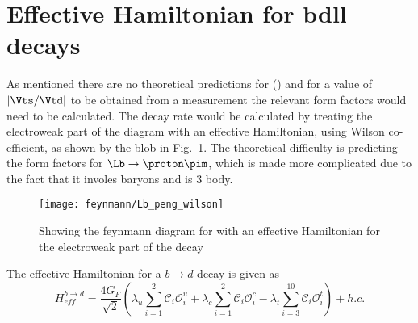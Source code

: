 \section{Effective Hamiltonian for b\to dll decays} %
As mentioned there are no theoretical predictions for \BF(\Lbpi) and for a value of $|\Vts/\Vtd|$ to be obtained from a measurement the relevant form factors would need to be calculated. The decay rate would be calculated by treating the electroweak part of the diagram with an effective Hamiltonian, using Wilson co-efficient, as shown by the blob in Fig.~\ref{fig:wilson}. The theoretical difficulty is predicting the form factors for $\Lb\to\proton\pim$, which is made more complicated due to the fact that it involes baryons and is 3 body.
\begin{figure}[h!]
  \centering
  \texttt{[image: feynmann/Lb\_peng\_wilson]}
  \caption{Showing the feynmann diagram for \Lbpi with an effective Hamiltonian for the electroweak part of the decay~\cite{lowrecoil}}
  \label{fig:wilson}
    \end{figure}
The effective Hamiltonian for a $b\to d$ decay is given as
\begin{equation}
H^{b\to d}_{eff} = \frac{4G_{F}}{\sqrt{2}}(\lambda_{u}\sum^{2}_{i=1}\mathcal{C}_{i}\mathcal{O}^{u}_{i} + \lambda_{c}\sum^{2}_{i=1}\mathcal{C}_{i}\mathcal{O}^{c}_{i} - \lambda_{t}\sum^{10}_{i=3}\mathcal{C}_{i}\mathcal{O}^{t}_{i}) + h.c.
\end{equation}

